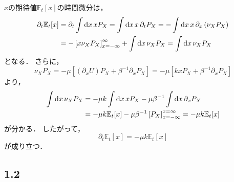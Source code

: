\documentclass[a4paper,11pt]{jsarticle}
\begin{document}
$x$の期待値$\mathbb{E}_t[x]$の時間微分は，
\begin{align}
  \partial_t \mathbb{E}_t[x] 
  &= \partial_t \int \dd{x} x P_X %
  = \int \dd{x} x \,\partial_t P_X %
  = -\int \dd{x} x\, \partial_x \left(\nu_X P_X\right) \notag\\
  &= - \left[x\nu_X P_X\right]_{x=-\infty}^{\infty} + \int \dd{x} \nu_X P_X %
  = \int \dd{x} \nu_X P_X
\end{align}
となる．
さらに，
\begin{equation}
  \nu_X P_X = -\mu \left[(\partial_x U)P_X + \beta^{-1} \partial_x P_X\right] = -\mu \left[kx P_X + \beta^{-1} \partial_x P_X\right] \label{nuP}
\end{equation}
より，
\begin{align}
  \int \dd{x} \nu_X P_X
  &= -\mu k \int \dd{x} x P_X - \mu\beta^{-1} \int \dd{x} \partial_x P_X \notag\\
  &= -\mu k \mathbb{E}_t[x] - \mu\beta^{-1} \left[P_X\right]_{x=-\infty}^{x=\infty} %
  = -\mu k \mathbb{E}_t[x] \label{i_nuP}
\end{align}
が分かる．
したがって，
\begin{equation}
  \partial_t \mathbb{E}_t[x] = -\mu k \mathbb{E}_t[x] 
\end{equation}
が成り立つ．

\subsection*{1.2}
\end{document}
